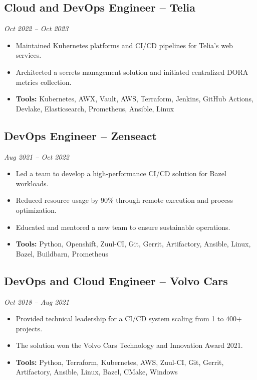 \documentclass[11pt,a4paper]{article}
\begin{document}
\subsection{Cloud and DevOps Engineer -- Telia}
\textit{Oct 2022 -- Oct 2023}
\begin{itemize}[leftmargin=*]
    \item Maintained Kubernetes platforms and CI/CD pipelines for Telia's web services.
    \item Architected a secrets management solution and initiated centralized DORA metrics collection.
    \item \textbf{Tools:} Kubernetes, AWX, Vault, AWS, Terraform, Jenkins, GitHub Actions, Devlake, Elasticsearch, Prometheus, Ansible, Linux
\end{itemize}

\subsection{DevOps Engineer -- Zenseact}
\textit{Aug 2021 -- Oct 2022}
\begin{itemize}[leftmargin=*]
    \item Led a team to develop a high-performance CI/CD solution for Bazel workloads.
    \item Reduced resource usage by 90\% through remote execution and process optimization.
    \item Educated and mentored a new team to ensure sustainable operations.
    \item \textbf{Tools:} Python, Openshift, Zuul-CI, Git, Gerrit, Artifactory, Ansible, Linux, Bazel, Buildbarn, Prometheus
\end{itemize}

\subsection{DevOps and Cloud Engineer -- Volvo Cars}
\textit{Oct 2018 -- Aug 2021}
\begin{itemize}[leftmargin=*]
    \item Provided technical leadership for a CI/CD system scaling from 1 to 400+ projects.
    \item The solution won the Volvo Cars Technology and Innovation Award 2021.
    \item \textbf{Tools:} Python, Terraform, Kubernetes, AWS, Zuul-CI, Git, Gerrit, Artifactory, Ansible, Linux, Bazel, CMake, Windows
\end{itemize}
\end{document}
